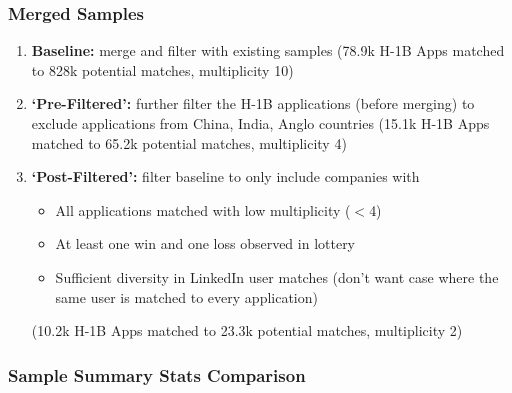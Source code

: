 \documentclass[xcolor=dvipsnames, compress, 12pt, aspectratio=169, handout]{beamer}
\begin{document}
\begin{frame}
    \frametitle{Merged Samples}
    \begin{enumerate}
        \item \textbf{Baseline:} merge and filter with existing samples (78.9k H-1B Apps matched to 828k potential matches, multiplicity 10) \vspace{2mm}
        \item \textbf{`Pre-Filtered':} further filter the H-1B applications (before merging) to exclude applications from China, India, Anglo countries (15.1k H-1B Apps matched to 65.2k potential matches, multiplicity 4) \vspace{2mm}
        \item \textbf{`Post-Filtered':} filter baseline to only include companies with
        \begin{itemize}
            \item All applications matched with low multiplicity ($<$4)
            \item At least one win and one loss observed in lottery
            \item Sufficient diversity in LinkedIn user matches (don't want case where the same user is matched to every application)
        \end{itemize}
        (10.2k H-1B Apps matched to 23.3k potential matches, multiplicity 2)
    \end{enumerate}    
\end{frame}

\begin{frame}
    \frametitle{Sample Summary Stats Comparison}
    \centering
\small
{}
\end{frame}
\end{document}
